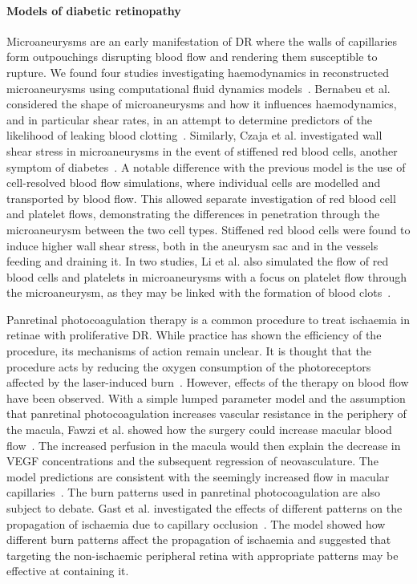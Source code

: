 \documentclass{article}
\begin{document}
\paragraph*{Models of diabetic retinopathy}

Microaneurysms are an early manifestation of DR where the walls of capillaries form outpouchings disrupting blood flow and rendering them susceptible to rupture.
We found four studies investigating haemodynamics in reconstructed microaneurysms using computational fluid dynamics models~\cite{Bernabeu_2018,Czaja_2022,Li_2020,Li_2022}.
Bernabeu et al. considered the shape of microaneurysms and how it influences haemodynamics, and in particular shear rates, in an attempt to determine predictors of the likelihood of leaking blood clotting~\cite{Bernabeu_2018}.
Similarly, Czaja et al. investigated wall shear stress in microaneurysms in the event of stiffened red blood cells, another symptom of diabetes~\cite{Czaja_2022}.
A notable difference with the previous model is the use of cell-resolved blood flow simulations, where individual cells are modelled and transported by blood flow.
This allowed separate investigation of red blood cell and platelet flows, demonstrating the differences in penetration through the microaneurysm between the two cell types.
Stiffened red blood cells were found to induce higher wall shear stress, both in the aneurysm sac and in the vessels feeding and draining it.
In two studies, Li et al. also simulated the flow of red blood cells and platelets in microaneurysms with a focus on platelet flow through the microaneurysm, as they may be linked with the formation of blood clots~\cite{Li_2020,Li_2022}.


Panretinal photocoagulation therapy is a common procedure to treat ischaemia in retinae with proliferative DR.
While practice has shown the efficiency of the procedure, its mechanisms of action remain unclear.
It is thought that the procedure acts by reducing the oxygen consumption of the photoreceptors affected by the laser-induced burn~\cite{Fawzi_2019,Gast_2016}.
However, effects of the therapy on blood flow have been observed.
With a simple lumped parameter model and the assumption that panretinal photocoagulation increases vascular resistance in the periphery of the macula, Fawzi et al. showed how the surgery could increase macular blood flow~\cite{Fawzi_2019}.
The increased perfusion in the macula would then explain the decrease in VEGF concentrations and the subsequent regression of neovasculature.
The model predictions are consistent with the seemingly increased flow in macular capillaries~\cite{Fawzi_2019}.
The burn patterns used in panretinal photocoagulation are also subject to debate.
Gast et al. investigated the effects of different patterns on the propagation of ischaemia due to capillary occlusion~\cite{Gast_2016}.
The model showed how different burn patterns affect the propagation of ischaemia and suggested that targeting the non-ischaemic peripheral retina with appropriate patterns may be effective at containing it.
\end{document}
